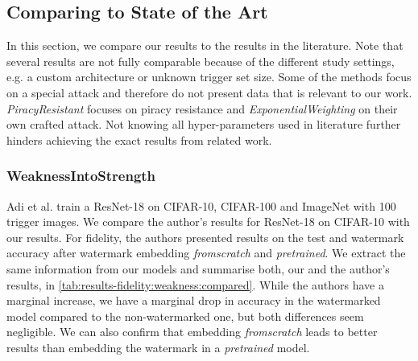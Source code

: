 
%


%
\clearpage

\subsection{Comparing to State of the Art} \label{sec:compare-results}

In this section, we compare our results to the results in the literature. Note that several results are not fully comparable because of the different study settings, e.g. a custom architecture or unknown trigger set size. Some of the methods focus on a special attack and therefore do not present data that is relevant to our work. \textit{PiracyResistant} \cite{li_piracy_2020} focuses on piracy resistance and \textit{ExponentialWeighting} \cite{namba_robust_2019} on their own crafted attack.
Not knowing all hyper-parameters used in literature further hinders achieving the exact results from related work.

\subsubsection{WeaknessIntoStrength} \label{sec:compare-results:weakness}

Adi et al. \cite{adi_turning_2018} train a ResNet-18 on CIFAR-10, CIFAR-100 and ImageNet with 100 trigger images. We compare the author's results for ResNet-18 on CIFAR-10 with our results. For fidelity, the authors presented results on the test and watermark accuracy after watermark embedding \textit{fromscratch} and \textit{pretrained}. We extract the same information from our models and summarise both, our and the author's results, in \cref{tab:results-fidelity:weakness:compared}. While the authors have a marginal increase, we have a marginal drop in accuracy in the watermarked model compared to the non-watermarked one, but both differences seem negligible. We can also confirm that embedding \textit{fromscratch} leads to better results than embedding the watermark in a \textit{pretrained} model.


